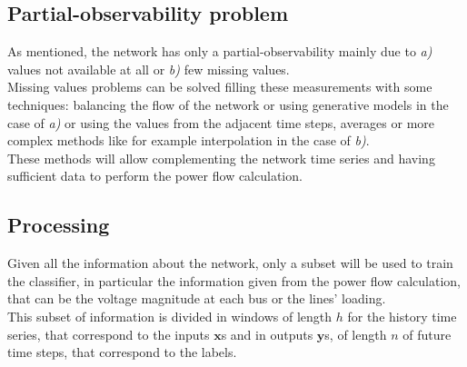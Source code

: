 \subsection{Partial-observability problem}
As mentioned, the network has only a partial-observability mainly due to \emph{a)} values not available at all or \emph{b)} few missing values. \\

Missing values problems can be solved filling these measurements with some techniques: balancing the flow of the network or using generative models in the case of \emph{a)} or using the values from the adjacent time steps, averages or more complex methods like for example interpolation in the case of \emph{b)}. \\

These methods will allow complementing the network time series and having sufficient data to perform the power flow calculation.

\subsection{Processing}
Given all the information about the network, only a subset will be used to train the classifier, in particular the information given from the power flow calculation, that can be the voltage magnitude at each bus or the lines' loading. \\

This subset of information is divided in windows of length $h$ for the history time series, that correspond to the inputs $\textbf{x}$s and in outputs $\textbf{y}$s, of length $n$ of future time steps, that correspond to the labels.



